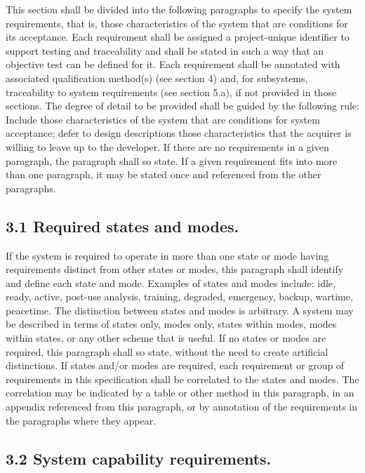 This section shall be divided into the following paragraphs to specify
the system requirements, that is, those characteristics of the system
that are conditions for its acceptance. Each requirement shall be
assigned a project-unique identifier to support testing and traceability
and shall be stated in such a way that an objective test can be defined
for it. Each requirement shall be annotated with associated
qualification method(s) (see section 4) and, for subsystems,
traceability to system requirements (see section 5.a), if not provided
in those sections. The degree of detail to be provided shall be guided
by the following rule: Include those characteristics of the system that
are conditions for system acceptance; defer to design descriptions those
characteristics that the acquirer is willing to leave up to the
developer. If there are no requirements in a given paragraph, the
paragraph shall so state. If a given requirement fits into more than one
paragraph, it may be stated once and referenced from the other
paragraphs.

\subsection{3.1 Required states and modes.}

If the system is required to operate in more than one state or mode
having requirements distinct from other states or modes, this paragraph
shall identify and define each state and mode. Examples of states and
modes include: idle, ready, active, post-use analysis, training,
degraded, emergency, backup, wartime, peacetime. The distinction between
states and modes is arbitrary. A system may be described in terms of
states only, modes only, states within modes, modes within states, or
any other scheme that is useful. If no states or modes are required,
this paragraph shall so state, without the need to create artificial
distinctions. If states and/or modes are required, each requirement or
group of requirements in this specification shall be correlated to the
states and modes. The correlation may be indicated by a table or other
method in this paragraph, in an appendix referenced from this paragraph,
or by annotation of the requirements in the paragraphs where they
appear.

\subsection{3.2 System capability requirements.}

